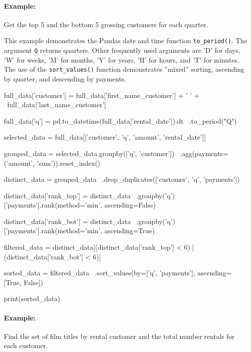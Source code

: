 \paragraph*{Example:} Get the top 5 and the bottom 5 grossing customers for each quarter.

This example demonstrates the Pandas date and time function \texttt{to\_period()}. The argument \texttt{Q} returns quarters. Other frequently used arguments are 'D' for days, 'W' for weeks, 'M' for months, 'Y' for years, 'H' for hours, and 'T' for minutes. The use of the \texttt{sort\_values()} function demonstrates ''mixed'' sorting, ascending by quarter, and descending by payments.

\begin{samepage}
\begin{pythoncode}
full_data['customer'] = full_data['first_name_customer'] + ' ' + \
                        full_data['last_name_customer']

full_data['q'] = pd.to_datetime(full_data['rental_date']).dt \
                   .to_period("Q")

selected_data = full_data[['customer', 'q', 'amount', 'rental_date']]

grouped_data = selected_data.groupby(['q', 'customer']) \
        .agg(payments=('amount', 'sum')).reset_index()

distinct_data = grouped_data \
        .drop_duplicates(['customer', 'q', 'payments'])
        
distinct_data['rank_top'] = distinct_data \
        .groupby('q')['payments'].rank(method='min', ascending=False)
    
distinct_data['rank_bot'] = distinct_data \
        .groupby('q')['payments'].rank(method='min', ascending=True)
    
filtered_data = distinct_data[(distinct_data['rank_top'] < 6) | 
                              (distinct_data['rank_bot'] < 6)]
        
sorted_data = filtered_data \
        .sort_values(by=['q', 'payments'], ascending=[True, False])
        
print(sorted_data)
\end{pythoncode}
\end{samepage}

\paragraph*{Example:} Find the set of film titles by rental customer and the total number rentals for each customer.

